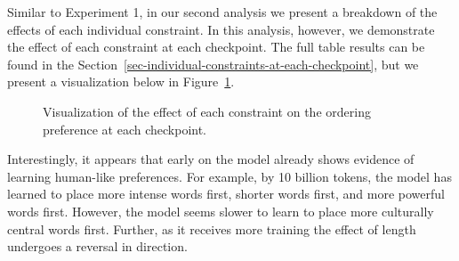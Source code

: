 \documentclass[
  nottoc]{article}
\begin{document}
Similar to Experiment 1, in our second analysis we present a breakdown
of the effects of each individual constraint. In this analysis, however,
we demonstrate the effect of each constraint at each checkpoint. The
full table results can be found in the
Section~\ref{sec-individual-constraints-at-each-checkpoint}, but we
present a visualization below in Figure~\ref{fig-exp2m2}.

\begin{figure}


\caption{\label{fig-exp2m2}Visualization of the effect of each
constraint on the ordering preference at each checkpoint.}

\end{figure}%

Interestingly, it appears that early on the model already shows evidence
of learning human-like preferences. For example, by 10 billion tokens,
the model has learned to place more intense words first, shorter words
first, and more powerful words first. However, the model seems slower to
learn to place more culturally central words first. Further, as it
receives more training the effect of length undergoes a reversal in
direction.
\end{document}
